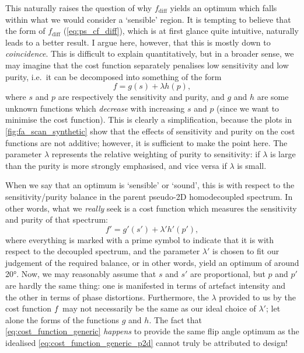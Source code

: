 This naturally raises the question of why $f_\text{diff}$ yields an optimum which falls within what we would consider a `sensible' region.
It is tempting to believe that the form of $f_\text{diff}$ (\cref{eq:ps_cf_diff}), which is at first glance quite intuitive, naturally leads to a better result.
I argue here, however, that this is mostly down to \textit{coincidence}.
This is difficult to explain quantitatively, but in a broader sense, we may imagine that the cost function separately penalises low sensitivity and low purity, i.e.\ it can be decomposed into something of the form
\begin{equation}
    \label{eq:cost_function_generic}
    f = g(s) + \lambda h(p),
\end{equation}
where $s$ and $p$ are respectively the sensitivity and purity, and $g$ and $h$ are some unknown functions which \textit{decrease} with increasing $s$ and $p$ (since we want to minimise the cost function).
This is clearly a simplification, because the plots in \cref{fig:fa_scan_synthetic} show that the effects of sensitivity and purity on the cost functions are not additive; however, it is sufficient to make the point here.
The parameter $\lambda$ represents the relative weighting of purity to sensitivity: if $\lambda$ is large than the purity is more strongly emphasised, and vice versa if $\lambda$ is small.

When we say that an optimum is `sensible' or `sound', this is with respect to the sensitivity/purity balance in the parent pseudo-2D homodecoupled spectrum.
In other words, what we \textit{really} seek is a cost function which measures the sensitivity and purity of that spectrum:
\begin{equation}
    \label{eq:cost_function_generic_p2d}
    f' = g'(s') + \lambda' h'(p'),
\end{equation}
where everything is marked with a prime symbol to indicate that it is with respect to the decoupled spectrum, and the parameter $\lambda'$ is chosen to fit our judgement of the required balance, or in other words, yield an optimum of around \ang{20}.
Now, we may reasonably assume that $s$ and $s'$ are proportional, but $p$ and $p'$ are hardly the same thing: one is manifested in terms of artefact intensity and the other in terms of phase distortions.
Furthermore, the $\lambda$ provided to us by the cost function $f\/$ may not necessarily be the same as our ideal choice of $\lambda'$; let alone the forms of the functions $g$ and $h$.
The fact that \cref{eq:cost_function_generic} \textit{happens} to provide the same flip angle optimum as the idealised \cref{eq:cost_function_generic_p2d} cannot truly be attributed to design!

